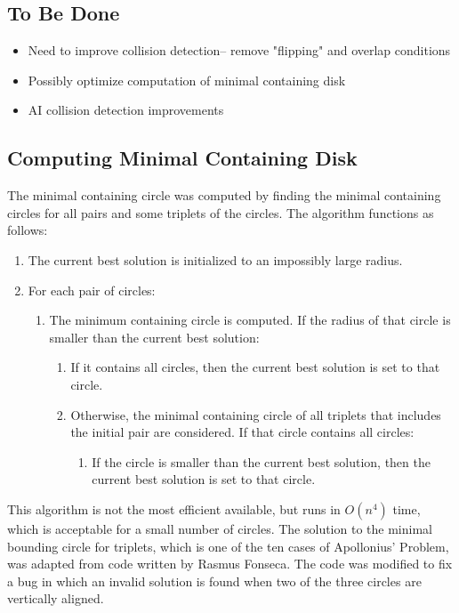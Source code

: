 \documentclass[a4paper]{article}
\begin{document}
 \subsection*{To Be Done}
  \begin{multicols}{2}
 \begin{itemize}
\item Need to improve collision detection-- remove "flipping" and overlap conditions
\item Possibly optimize computation of minimal containing disk
\item AI collision detection improvements
\end{itemize}
\end{multicols}
 
\subsection*{Computing Minimal Containing Disk}
The minimal containing circle was computed by finding the minimal containing circles for all pairs and some triplets of the circles.
The algorithm functions as follows:
\begin{enumerate}
	\item The current best solution is initialized to an impossibly large radius.
	\item For each pair of circles:
	\begin{enumerate}
		\item The minimum containing circle is computed.  If the radius of that circle is smaller than the current best solution:
		\begin{enumerate}
			\item If it contains all circles, then the current best solution is set to that circle.
			\item Otherwise, the minimal containing circle of all triplets that includes the initial pair are considered.  If that circle contains all circles:
			\begin{enumerate}
				\item If the circle is smaller than the current best solution, then the current best solution is set to that circle.
			\end{enumerate}
		\end{enumerate}
	\end{enumerate}
\end{enumerate}

This algorithm is not the most efficient available, but runs in $O(n^4)$ time, which is acceptable for a small number of circles.
The solution to the minimal bounding circle for triplets, which is one of the ten cases of Apollonius' Problem, was adapted from code written by Rasmus Fonseca.
The code was modified to fix a bug in which an invalid solution is found when two of the three circles are vertically aligned.
\end{document}
